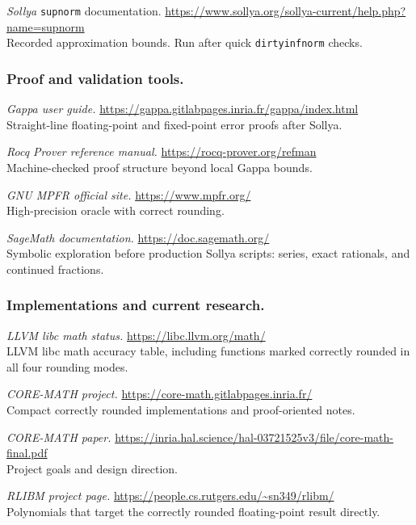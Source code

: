 \documentclass[manuscript, nonacm]{acmart}
\begin{document}
  \emph{Sollya} \texttt{supnorm} documentation.
  \url{https://www.sollya.org/sollya-current/help.php?name=supnorm}\\
  Recorded approximation bounds. Run after quick \texttt{dirtyinfnorm} checks.

  \subsubsection{Proof and validation tools.}

  \emph{Gappa user guide.}
  \url{https://gappa.gitlabpages.inria.fr/gappa/index.html}\\
  Straight-line floating-point and fixed-point error proofs after Sollya.

  \emph{Rocq Prover reference manual.}
  \url{https://rocq-prover.org/refman}\\
  Machine-checked proof structure beyond local Gappa bounds.

  \emph{GNU MPFR official site.}
  \url{https://www.mpfr.org/}\\
  High-precision oracle with correct rounding.

  \emph{SageMath documentation.}
  \url{https://doc.sagemath.org/}\\
  Symbolic exploration before production Sollya scripts: series, exact
  rationals, and continued fractions.

  \subsubsection{Implementations and current research.}

  \emph{LLVM libc math status.}
  \url{https://libc.llvm.org/math/}\\
  LLVM libc math accuracy table, including functions marked correctly rounded
  in all four rounding modes.

  \emph{CORE-MATH project.}
  \url{https://core-math.gitlabpages.inria.fr/}\\
  Compact correctly rounded implementations and proof-oriented notes.

  \emph{CORE-MATH paper.}
  \url{https://inria.hal.science/hal-03721525v3/file/core-math-final.pdf}\\
  Project goals and design direction.

  \emph{RLIBM project page.}
  \url{https://people.cs.rutgers.edu/~sn349/rlibm/}\\
  Polynomials that target the correctly rounded floating-point result directly.
\end{document}
